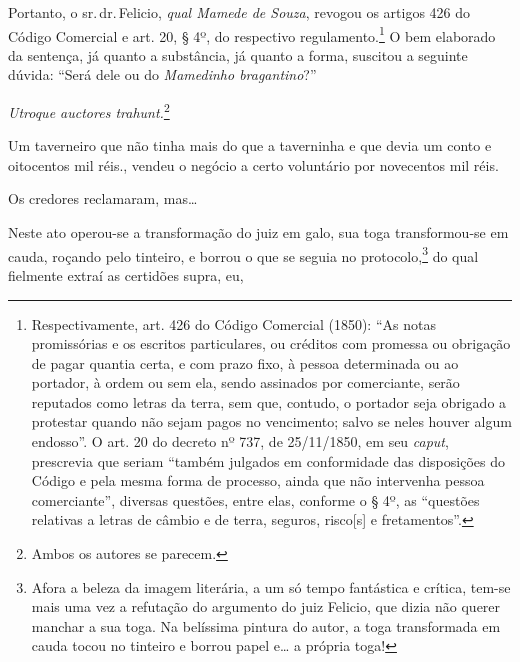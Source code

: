 Portanto, o sr.\,dr.\,Felicio, \emph{qual Mamede de Souza}, revogou os
artigos 426 do Código Comercial e art. 20, § 4º, do respectivo
regulamento.\footnote{ Respectivamente, art. 426 do Código Comercial
  (1850): ``As notas promissórias e os escritos particulares, ou créditos
  com promessa ou obrigação de pagar quantia certa, e com prazo fixo, à
  pessoa determinada ou ao portador, à ordem ou sem ela, sendo assinados
  por comerciante, serão reputados como letras da terra, sem que,
  contudo, o portador seja obrigado a protestar quando não sejam pagos
  no vencimento; salvo se neles houver algum endosso''. O art. 20 do
  decreto nº 737, de 25/11/1850, em seu \emph{caput}, prescrevia que
  seriam ``também julgados em conformidade das dis­posições do Código e
  pela mesma forma de processo, ainda que não intervenha pessoa
  comerciante'', diversas questões, entre elas, conforme o § 4º, as
  ``questões relativas a letras de câmbio e de terra, seguros,
  risco{[}s{]} e fretamentos''.} O bem elaborado da sentença, já quanto a
substância, já quanto a forma, suscitou a seguinte dúvida: ``Será dele ou
do \emph{Mamedinho bragantino}?''

\emph{Utroque auctores trahunt.}\footnote{ Ambos os autores se parecem.}

\asterisc{}

Um taverneiro que não tinha mais do que a taverninha e que devia um
conto e oitocentos mil réis., vendeu o negócio a certo voluntário por
novecentos mil réis.

Os credores reclamaram, mas\ldots{}

Neste ato operou-se a transformação do juiz em galo, sua toga
transformou-se em cauda, roçando pelo tinteiro, e borrou o que se seguia
no protocolo,\footnote{ Afora a beleza da imagem literária, a um só
  tempo fantástica e crítica, tem-se mais uma vez a refutação do
  argumento do juiz Felicio, que dizia não querer manchar a sua toga. Na
  belíssima pintura do autor, a toga transformada em cauda tocou no
  tinteiro e borrou papel e\ldots{} a própria toga!} do qual fielmente extraí
as certidões supra, eu,

